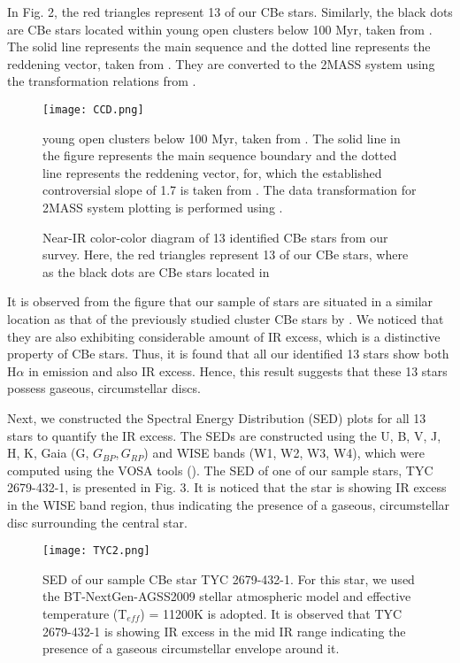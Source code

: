 \documentclass{jaa}
\begin{document}
In Fig. 2, the red triangles represent 13 of our CBe stars. Similarly, the black dots are CBe stars located within young open clusters below 100 Myr, taken from \cite{2008Mathew}. The solid line represents the main sequence and the dotted line represents the reddening vector, taken from \cite{1983Koornneef}. They are converted to the 2MASS system using the transformation relations from \cite{2001Carpenter}.

\begin{figure}
\centering
\texttt{[image: CCD.png]} 
\caption{Near-IR color-color diagram of 13 identified CBe stars from our survey. Here, the red triangles represent 13 of our CBe stars, where as the black dots are CBe stars located in} young open clusters below 100 Myr, taken from \cite{2008Mathew}. The solid line in the figure represents the main sequence boundary and the dotted line represents the reddening vector, for, which the established controversial slope of 1.7 is taken from \cite{1983Koornneef}. The data transformation for 2MASS system plotting is performed using \cite{2001Carpenter}.
\end{figure}

It is observed from the figure that our sample of stars are situated in a similar location as that of the previously studied cluster CBe stars by \cite{2008Mathew}. We noticed that they are also exhibiting considerable amount of IR excess, which is a distinctive property of CBe stars. Thus, it is found that all our identified 13 stars show both H$\alpha$ in emission and also IR excess. Hence, this result suggests that these 13 stars possess gaseous, circumstellar discs.

Next, we constructed the Spectral Energy Distribution (SED) plots for all 13 stars to quantify the IR excess. The SEDs are constructed using the U, B, V, J, H, K, Gaia (G, $G_{BP}, G_{RP}$) and WISE bands (W1, W2, W3, W4), which were computed using the VOSA tools (\citealt{2008Bayo}). The SED of one of our sample stars, TYC 2679-432-1, is presented in Fig. 3. It is noticed that the star is showing IR excess in the WISE band region, thus indicating the presence of a gaseous, circumstellar disc surrounding the central star.

\begin{figure}
\centering
\texttt{[image: TYC2.png]}
\caption{SED of our sample CBe star TYC 2679-432-1. For this star, we used the BT-NextGen-AGSS2009 stellar atmospheric model and effective temperature (T$_{eff}$) = 11200K is adopted. It is observed that TYC 2679-432-1 is showing IR excess in the mid IR range indicating the presence of a gaseous circumstellar envelope around it.} 
\end{figure}
\end{document}
